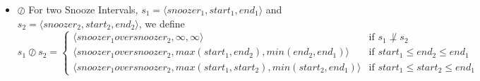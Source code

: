 \documentclass[fleqn]{article}
\newcommand{\triple}[3]{\langle #1,#2,#3 \rangle}
\newcommand{\iinter}{\oslash}
\newcommand{\ioverlap}{\perp}
\begin{document}
\begin{itemize}
  \item \textbf{$\iinter$}
    For two Snooze Intervals,
    $s_1=\triple{snoozer_1}{start_1}{end_1}$ and
    $s_2=\triple{snoozer_2}{start_2}{end_2}$, we define
    $s_1 \iinter s_2 =
       \begin{cases}
         \triple{snoozer_1 over snoozer_2}{\infty}{\infty} &
           \text{if } s_1 \not\ioverlap s_2\\
         \triple{snoozer_1 over snoozer_2}{max(start_1,end_2)}
                                          {min(end_2, end_1)} &
           \text{if } start_1 \leq end_2 \leq end_1\\
         \triple{snoozer_1 over snoozer_2}{max(start_1,start_2)}
                                   {min(start_2,end_1)} &
           \text{if } start_1 \leq start_2 \leq end_1
       \end{cases}$
\end{itemize}
\end{document}
